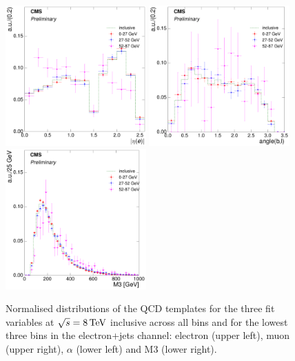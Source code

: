 \begin{figure}[hbtp]
    \centering
     \includegraphics[width=0.48\textwidth]{Chapters/04_Analysis/04b_XSections/images/8TeV/fit_variables/electron/MET/electron_absolute_eta/qcd/MET_electron_absolute_eta_0orMoreBtag_QCD_template_comparison.pdf}\hfill
     \includegraphics[width=0.48\textwidth]{Chapters/04_Analysis/04b_XSections/images/8TeV/fit_variables/electron/MET/angle_bl/qcd/MET_angle_bl_1orMoreBtag_QCD_template_comparison.pdf}\\
     \includegraphics[width=0.48\textwidth]{Chapters/04_Analysis/04b_XSections/images/8TeV/fit_variables/electron/MET/M3/qcd/MET_M3_0orMoreBtag_QCD_template_comparison.pdf}\\
	 \caption{Normalised distributions of the QCD templates for the three fit variables at $\sqrt{s}=8\,\text{Te\hspace{-.08em}V}$
	 inclusive across all \met bins and for the lowest three \met bins in the electron+jets channel: electron
	 \abseta (upper left), muon \abseta (upper right), $\alpha$ (lower left) and M3 (lower right).}
     \label{fig:fit_variable_qcd_comparisons_8TeV}
\end{figure}

